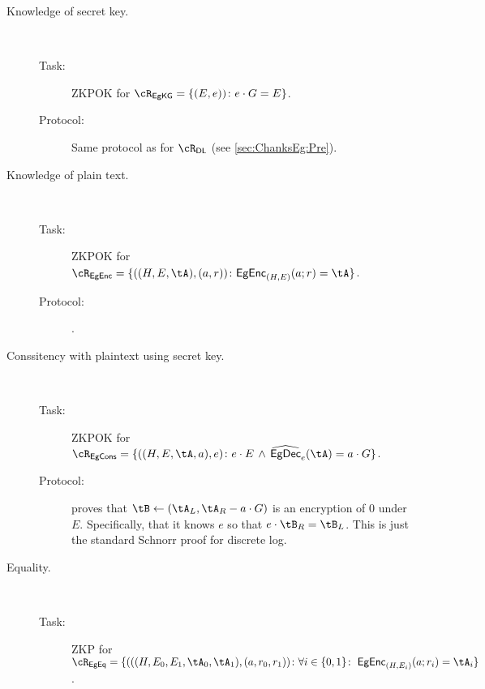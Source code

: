 \begin{description}
	\item[Knowledge of secret key.] ~
	
	
	
	\begin{description}
		\item[Task:] ZKPOK for $\rEgKeyGen = \rEgKeyGenDef$.
		
		\item[Protocol:] Same protocol as for $\rdl$ (see \cref{sec:ChanksEg:Pre}).
	\end{description}
	
	
	\item[Knowledge of plain text.] ~
	
	\begin{description}
		\item[Task:] ZKPOK for  $\rEgEnc=\rEgEncDef$.
		
		\item[Protocol:]   \cite[Protocol A.2]{HaitnerLNR23}.
		
		
	\end{description}
	
	
	
	
		\item[Conssitency  with plaintext using secret key.] ~
	
	\begin{description}
		\item[Task:] ZKPOK for  $\rEgConsSk=\rEgConsSkDef$.
		
		\item[Protocol:]   
		
		\Pc proves that $\tB \asn (\tA_L, \tA_R - a \cdot G)$ is an encryption of $0$ under $E$. Specifically, that it knows $e$ so that  $e\cdot \tB_R  = \tB_L$. This is just the standard Schnorr proof for discrete log.
		
		
	\end{description}
	
	
	
	\item[Equality.] ~

	
	
	\begin{description}
		\item[Task:] ZKP for  $\rEgEq =\rEgEqDef$.
		

\end{description}
\end{description}
